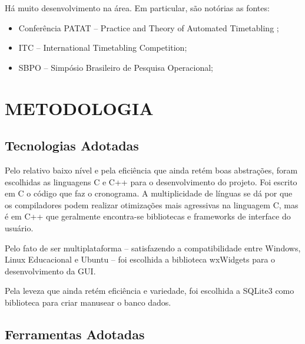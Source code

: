 \documentclass[12pt,a4paper]{article}
\begin{document}
		\vspace{1cm}
		Há muito desenvolvimento na área. Em particular, são notórias as fontes:

		\begin{itemize}
			\item Conferência PATAT -- Practice and Theory of Automated Timetabling ;
			\item ITC -- International Timetabling Competition;
			\item SBPO -- Simpósio Brasileiro de Pesquisa Operacional;
		\end{itemize}

	\clearpage

	\section{METODOLOGIA}

		\subsection{Tecnologias Adotadas}

			\par Pelo relativo baixo nível e pela eficiência que ainda retém boas abstrações, foram escolhidas as linguagens C e C++ para o desenvolvimento do projeto. Foi escrito em C o código que faz o cronograma. A multiplicidade de línguas se dá por que os compiladores podem realizar otimizações mais agressivas na linguagem C, mas é em C++ que geralmente encontra-se bibliotecas e frameworks de interface do usuário.

			\par Pelo fato de ser multiplataforma -- satisfazendo a compatibilidade entre Windows, Linux Educacional e Ubuntu -- foi escolhida a biblioteca wxWidgets para o desenvolvimento da GUI.

			\par Pela leveza que ainda retém eficiência e variedade, foi escolhida a SQLite3 como biblioteca para criar manusear o banco dados.

		\subsection{Ferramentas Adotadas}
\end{document}
